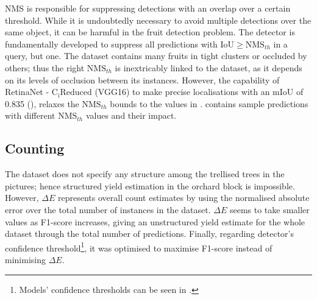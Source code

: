 NMS is responsible for suppressing detections with an overlap over a certain threshold. While it is undoubtedly necessary to avoid multiple detections over the same object, it can be harmful in the fruit detection problem. The detector is fundamentally developed to suppress all predictions with $\text{IoU}\geq\text{NMS}_{th}$ in a query, but one. The dataset contains many fruits in tight clusters or occluded by others; thus the right $\text{NMS}_{th}$ is inextricably linked to the dataset, as it depends on its levels of occlusion between its instances. However, the capability of RetinaNet - $\text{C}_\text{i}\text{Reduced}$ (VGG16) to make precise localisations with an mIoU of 0.835 (), relaxes the $\text{NMS}_{th}$ bounds to the values in .  contains sample predictions with different $\text{NMS}_{th}$ values and their impact.

\subsection{Counting}
The dataset does not specify any structure among the trellised trees in the pictures; hence structured yield estimation in the orchard block is impossible. However, $\Delta E$ represents overall count estimates by using the normalised absolute error over the total number of instances in the dataset. $\Delta E$ seems to take smaller values as F1-score increases, giving an unstructured yield estimate for the whole dataset through the total number of predictions. Finally, regarding detector's confidence threshold\footnote{Models' confidence thresholds can be seen in .}, it was optimised to maximise F1-score instead of minimising $\Delta E$.
